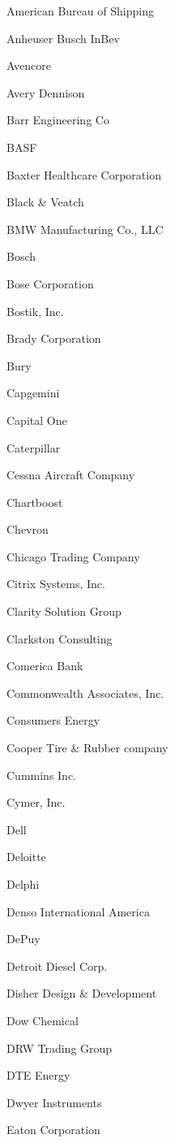 \documentclass[twoside]{article}
\begin{document}
\begin{center}
\begin{multicols}{5}
\begin{FlushLeft}
\begin{compactitem}
\item American Bureau of Shipping
\item Anheuser Busch InBev
\item Avencore
\item Avery Dennison
\item Barr Engineering Co
\item BASF
\item Baxter Healthcare Corporation
\item Black \& Veatch
\item BMW Manufacturing Co., LLC
\item Bosch
\item Bose Corporation
\item Bostik, Inc.
\item Brady Corporation
\item Bury
\item Capgemini
\item Capital One
\item Caterpillar
\item Cessna Aircraft Company
\item Chartboost
\item Chevron
\item Chicago Trading Company
\item Citrix Systems, Inc.
\item Clarity Solution Group
\item Clarkston Consulting
\item Comerica Bank
\item Commonwealth Associates, Inc.
\item Consumers Energy
\item Cooper Tire \& Rubber company
\item Cummins Inc.
\item Cymer, Inc.
\item Dell
\item Deloitte
\item Delphi
\item Denso International America
\item DePuy
\item Detroit Diesel Corp.
\item Disher Design \& Development
\item Dow Chemical
\item DRW Trading Group
\item DTE Energy
\item Dwyer Instruments
\item Eaton Corporation

\end{compactitem}
\end{FlushLeft}
\end{multicols}
\end{center}
\end{document}
